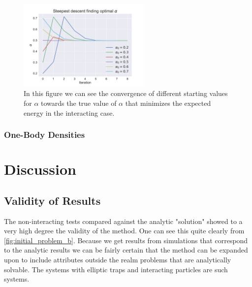 \documentclass[
    a4paper, aps, twocolumn, floatfix, superscriptaddress, nofootinbib]{revtex4-1}
\newcommand{\1}{\mathds{1}}
\begin{document}
            \begin{figure}
                \includegraphics[width=244px]{../data/figures/problem_f.pdf}
                \caption{In this figure we can see the convergence of different
                starting values for $\alpha$ towards the true value of $\alpha$
                that minimizes the expected energy in the interacting case.}
                \label{fig:gradient_descent_interacting}
            \end{figure}

		\subsubsection{One-Body Densities}
		

\section{Discussion}

    \subsection{Validity of Results}
        The non-interacting tests compared against the analytic "solution" showed
        to a very high degree the validity of the method. One can see this quite clearly
        from \autoref{fig:initial_problem_b}. Because we get results from simulations
        that correspond to the analytic results we can be fairly certain that the method
        can be expanded upon to include attributes outside the realm problems that are
        analytically solvable. The systems with elliptic traps and interacting particles are
        such systems.
\end{document}
